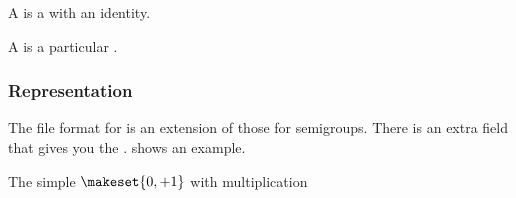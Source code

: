 
A \Monoid is a \Semigroup with an identity.


A \FiniteMonoid is a particular \FiniteSemigroup.


\subsubsection*{Representation}

The file format for  is an extension of those for semigroups.
There is an extra field  that gives you the .
 shows an example.

\begin{marginfigure}%
    \caption{The simple  $\makeset{0,+1}$ with multiplication}%
    \label{fig:monoid2}%
\end{marginfigure}%



